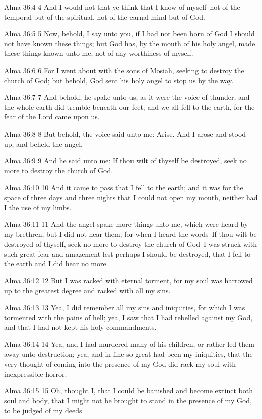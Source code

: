 Alma 36:4
 4 And I would not that ye think that I know of myself--not of
the temporal but of the spiritual, not of the carnal mind but of
God.

Alma 36:5
 5 Now, behold, I say unto you, if I had not been born of God I
should not have known these things; but God has, by the mouth of
his holy angel, made these things known unto me, not of any
worthiness of myself.

Alma 36:6
 6 For I went about with the sons of Mosiah, seeking to destroy
the church of God; but behold, God sent his holy angel to stop us
by the way.

Alma 36:7
 7 And behold, he spake unto us, as it were the voice of thunder,
and the whole earth did tremble beneath our feet; and we all fell
to the earth, for the fear of the Lord came upon us.

Alma 36:8
 8 But behold, the voice said unto me: Arise. And I arose and
stood up, and beheld the angel.

Alma 36:9
 9 And he said unto me: If thou wilt of thyself be destroyed,
seek no more to destroy the church of God.

Alma 36:10
 10 And it came to pass that I fell to the earth; and it was for
the space of three days and three nights that I could not open my
mouth, neither had I the use of my limbs.

Alma 36:11
 11 And the angel spake more things unto me, which were heard by
my brethren, but I did not hear them; for when I heard the
words--If thou wilt be destroyed of thyself, seek no more to
destroy the church of God--I was struck with such great fear and
amazement lest perhaps I should be destroyed, that I fell to the
earth and I did hear no more.

Alma 36:12
 12 But I was racked with eternal torment, for my soul was
harrowed up to the greatest degree and racked with all my sins.

Alma 36:13
 13 Yea, I did remember all my sins and iniquities, for which I
was tormented with the pains of hell; yea, I saw that I had
rebelled against my God, and that I had not kept his holy
commandments.

Alma 36:14
 14 Yea, and I had murdered many of his children, or rather led
them away unto destruction; yea, and in fine so great had been my
iniquities, that the very thought of coming into the presence of
my God did rack my soul with inexpressible horror.

Alma 36:15
 15 Oh, thought I, that I could be banished and become extinct
both soul and body, that I might not be brought to stand in the
presence of my God, to be judged of my deeds.

